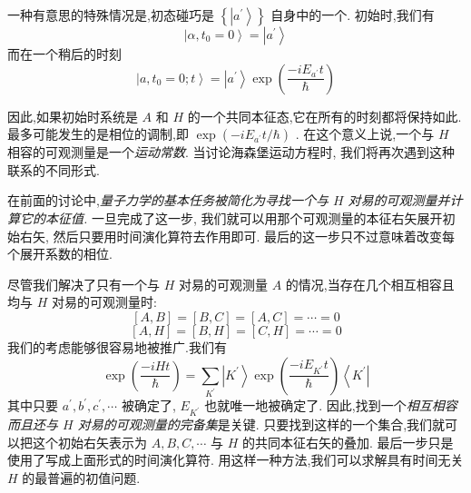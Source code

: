 \documentclass[lang=cn,newtx,10pt,scheme=chinese,thmcnt=section]{elegantbook}
\begin{document}
一种有意思的特殊情况是,初态碰巧是 $\left\{ \left| {a}^{\prime }\right\rangle \right\}$ 自身中的一个. 初始时,我们有
\begin{equation}
	\left| {\alpha ,{t}_{0} = 0}\right\rangle = \left| {a}^{\prime }\right\rangle
\end{equation}
而在一个稍后的时刻
\begin{equation}
	\left| {a,{t}_{0} = 0;t}\right\rangle = \left| {a}^{\prime }\right\rangle \exp \left( \frac{-i{E}_{{a}^{\prime }}t}{\hbar }\right)
\end{equation}

因此,如果初始时系统是 $A$ 和 $H$ 的一个共同本征态,它在所有的时刻都将保持如此. 最多可能发生的是相位的调制,即 $\exp \left( {-i{E}_{{a}^{\prime }}t/\hbar }\right)$ . 在这个意义上说,一个与 $H$ 相容的可观测量是一个\textit{运动常数}. 当讨论海森堡运动方程时, 我们将再次遇到这种联系的不同形式.

在前面的讨论中,\textit{量子力学的基本任务被简化为寻找一个与 $H$ 对易的可观测量并计算它的本征值.} 一旦完成了这一步, 我们就可以用那个可观测量的本征右矢展开初始右矢, 然后只要用时间演化算符去作用即可. 最后的这一步只不过意味着改变每个展开系数的相位.

尽管我们解决了只有一个与 $H$ 对易的可观测量 $A$ 的情况,当存在几个相互相容且均与 $H$ 对易的可观测量时:
\begin{equation}
	\left\lbrack {A, B}\right\rbrack = \left\lbrack {B, C}\right\rbrack = \left\lbrack {A, C}\right\rbrack = \cdots = 0
\end{equation}
\begin{equation}
	\left\lbrack {A, H}\right\rbrack = \left\lbrack {B, H}\right\rbrack = \left\lbrack {C, H}\right\rbrack = \cdots = 0
\end{equation}
我们的考虑能够很容易地被推广.我们有
\begin{equation}
	\exp \left( \frac{-{iHt}}{\hbar }\right) = \mathop{\sum }\limits_{{K}^{\prime }}\left| {K}^{\prime }\right\rangle \exp \left( \frac{-i{E}_{{K}^{\prime }}t}{\hbar }\right) \left\langle {K}^{\prime }\right|
\end{equation}
其中只要 ${a}^{\prime },{b}^{\prime },{c}^{\prime },\cdots$ 被确定了, ${E}_{{K}^{\prime }}$ 也就唯一地被确定了. 因此,找到一个\textit{相互相容而且还与 $H$ 对易的可观测量的完备集}是关键. 只要找到这样的一个集合,我们就可以把这个初始右矢表示为 $A, B, C,\cdots$ 与 $H$ 的共同本征右矢的叠加. 最后一步只是使用了写成上面形式的时间演化算符. 用这样一种方法,我们可以求解具有时间无关 $H$ 的最普遍的初值问题.
\end{document}
